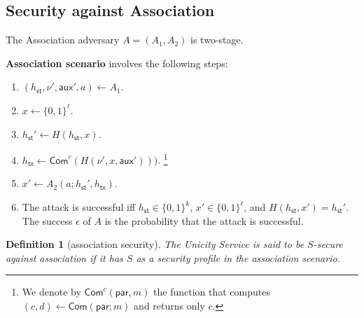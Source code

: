 \documentclass{article}
\newtheorem{definition}{Definition}[section]
\newcommand{\commit}[0]{\mathsf{Com}}
\newcommand{\commitc}[0]{\mathsf{Com}^{c}}
\newcommand{\param}[0]{\mathsf{par}}
\newcommand{\sthash}[0]{h_\mathsf{st}}
\newcommand{\txhash}[0]{h_\mathsf{tx}}
\newcommand{\auxd}[0]{\mathsf{aux}}
\newcommand{\predi}[0]{\nu}
\begin{document}
\subsection{Security against Association}

The Association adversary $A=(A_1,A_2)$ is two-stage. \medskip

\noindent\textbf{Association scenario} involves the following steps:
\begin{enumerate}
\item $(\sthash, \predi', \auxd', a)\gets A_1$.
\item $x\gets \{0,1\}^\ell$.
\item $\sthash'\gets H(\sthash,x)$.
\item $\txhash\gets\commitc(H(\predi',x,\auxd')))$.  \footnote{We denote by $\commitc(\param,m)$ the function that computes $(c,d)\gets \commit(\param; m)$ and returns only $c$.}
\item $x'\gets A_2(a; \sthash',\txhash)$.
\item The attack is successful iff $\sthash\in\{0,1\}^k$, $x'\in\{0,1\}^\ell$, and $H(\sthash,x')=\sthash'$. The success $\epsilon$ of $A$ is the probability that the attack is successful.
\end{enumerate}

\begin{definition}[association security]
The Unicity Service is said to be $S$-secure against association if it has $S$ as a security profile in the association scenario.
\end{definition}
\end{document}

